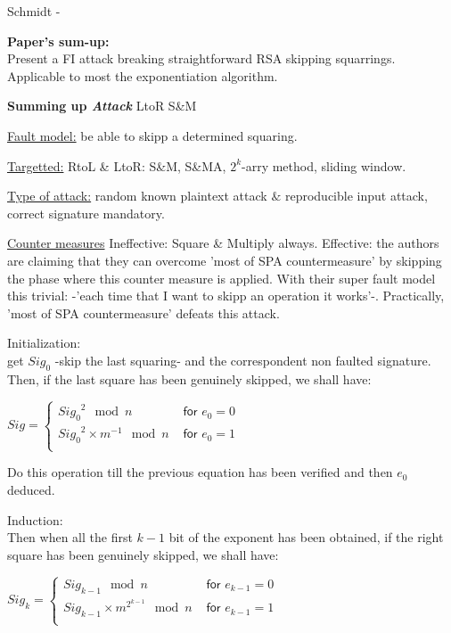 \item Schmidt - 

\textbf{Paper's sum-up:}\\
Present a FI attack breaking straightforward RSA skipping squarrings.
Applicable to most the exponentiation algorithm. 


\textbf{Summing up \textit{Attack}} LtoR S\&M

\underline{Fault model:}
be able to skipp a determined squaring.

\underline{Targetted:}
RtoL \& LtoR: S\&M, S\&MA, $2^k$-arry method, sliding window.

\underline{Type of attack:}
random known plaintext attack $\&$ reproducible input attack, 
correct signature mandatory. 

\underline{Counter measures}
Ineffective: Square \& Multiply always.
Effective: the authors are claiming that they can overcome 
'most of SPA countermeasure' by skipping the phase where this counter
measure is applied. With their super fault model this trivial:
-'each time that I want to skipp an operation it works'-. 
Practically, 'most of SPA countermeasure' defeats this attack.

Initialization:\\
get $Sig_0$ -skip the last squaring- and the correspondent non faulted signature.\\
Then, if the last square has been genuinely skipped, we shall have:
\begin{center}
$
Sig = \left\{
    \begin{array}{ll}
        {Sig_0}^2 \mod n & \textsf{ for } e_0=0 \\
        {Sig_0}^2 \times m^{-1}  \mod n & \textsf{ for } e_0=1 \\
    \end{array}
\right.
$
\end{center}
Do this operation till the previous equation has been verified and then $e_0$ deduced.

Induction:\\
Then when all the first $k-1$ bit of the exponent has been obtained, 
if the right square has been genuinely skipped, we shall have:
\begin{center}
$
Sig_k = \left\{
    \begin{array}{ll}
        {Sig_{k-1}} \mod n & \textsf{ for } e_{k-1}=0 \\
        {Sig_{k-1}} \times m^{2^{k-1}}  \mod n & \textsf{ for } e_{k-1}=1 \\
    \end{array}
\right.
$
\end{center}

